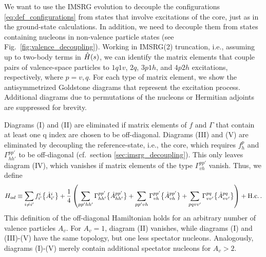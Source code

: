 We want to use the IMSRG evolution to decouple the configurations
\eqref{eq:def_configurations} from states that involve excitations 
of the core, just as in the ground-state calculations. In addition, 
we need to decouple them from states containing nucleons in non-valence 
particle states (see Fig.~\ref{fig:valence_decoupling}). Working in 
IMSRG(2) truncation, i.e., assuming up to two-body terms in $\hat{H}(s)$, 
we can identify the matrix elements that couple pairs of valence-space 
particles to $1q1v$, $2q$, $3p1h$, and $4p2h$ excitations, respectively, 
where $p=v,q$. For each type of matrix element, we show the antisymmetrized 
Goldstone diagrams \cite{Shavitt:2009} that represent the excitation process. 
Additional diagrams due to permutations of the nucleons or Hermitian 
adjoints are suppressed for brevity.

Diagrams (I) and (II) are eliminated if matrix elements of $f$ and 
$\Gamma$ that contain at least one q index are chosen to be off-diagonal. 
Diagrams (III) and (V) are eliminated by decoupling the reference-state, i.e.,
the core, which requires $f^{p}_{h}$ and $\Gamma^{pp'}_{hh'}$ to be off-diagonal 
(cf.~section \ref{sec:imsrg_decoupling}). This only leaves diagram (IV), 
which vanishes if matrix elements of the type $\Gamma^{pp'}_{vh}$ 
vanish. Thus, we define \cite{Tsukiyama:2012fk,Hergert:2017kx}
\begin{equation}\label{eq:def_Hod}
  H_{od} \equiv \sum_{i\neq i'}f^{i}_{i'}\nord{\AO^{i}_{i'}}
           + \frac{1}{4}\left(\sum_{pp'hh'}\Gamma^{pp'}_{hh'}\nord{\AO^{pp'}_{hh'}}
           + \sum_{pp'vh}\Gamma^{pp'}_{vh}\nord{\AO^{pp'}_{vh}}
           + \sum_{pqvv'}\Gamma^{pq}_{vv'}\nord{\AO^{pq}_{vv'}}\right)
           + \text{H.c.}\,.
\end{equation}
This definition of the off-diagonal Hamiltonian holds for an arbitrary
number of valence particles $A_v$. For $A_v=1$, diagram (II) vanishes, 
while diagrams (I) and (III)-(V) have the same topology, but one 
less spectator nucleons. Analogously, diagrams (I)-(V) merely contain 
additional spectator nucleons for $A_v>2$.


